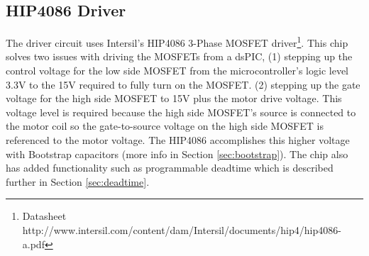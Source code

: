 \documentclass{article}
\begin{document}
\subsection{HIP4086 Driver}
The driver circuit uses Intersil's HIP4086 3-Phase MOSFET driver\footnote{Datasheet http://www.intersil.com/content/dam/Intersil/documents/hip4/hip4086-a.pdf}. This chip solves two issues with driving the MOSFETs from a dsPIC, (1) stepping up the control voltage for the low side MOSFET from the microcontroller's logic level 3.3V to the 15V required to fully turn on the MOSFET. (2) stepping up the gate voltage for the high side MOSFET to 15V plus the motor drive voltage. This voltage level is required because the high side MOSFET's source is connected to the motor coil so the gate-to-source voltage on the high side MOSFET is referenced to the motor voltage. The HIP4086 accomplishes this higher voltage with Bootstrap capacitors (more info in Section \ref{sec:bootstrap}). The chip also has added functionality such as programmable deadtime which is described further in Section \ref{sec:deadtime}.
\end{document}
